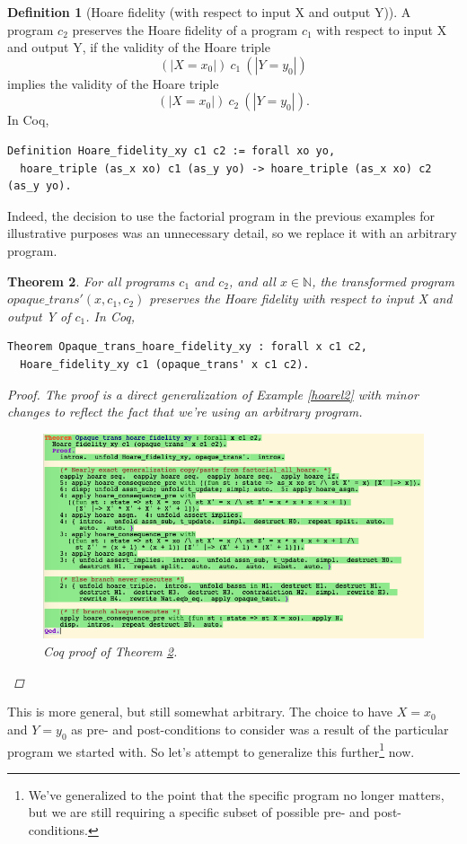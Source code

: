 \documentclass[12pt,notitlepage]{report}
\theoremstyle{plain}
\newtheorem{theo}{Theorem}[section]
\theoremstyle{definition}
\newtheorem{defin}[theo]{Definition}
\newcommand\N{\mathbb{N}}
\numberwithin{equation}{section}
\begin{document}
\begin{defin}[Hoare fidelity (with respect to input X and output Y)]
A program $c_2$ preserves the Hoare fidelity of a program $c_1$ with respect to input X and output Y, if the validity of the Hoare triple
\[
(| X = x_0 |)\ c_1\ (| Y = y_0 |)
\]
implies the validity of the Hoare triple
\[
(| X = x_0 |)\ c_2\ (| Y = y_0 |).
\]
In Coq,
\begin{verbatim}
Definition Hoare_fidelity_xy c1 c2 := forall xo yo,
  hoare_triple (as_x xo) c1 (as_y yo) -> hoare_triple (as_x xo) c2 (as_y yo).\end{verbatim}
\end{defin}

Indeed, the decision to use the factorial program in the previous examples for illustrative purposes was an unnecessary detail, so we replace it with an arbitrary program.

\begin{theo}\label{hoare_xy_main}
For all programs $c_1$ and $c_2$, and all $x \in \N$, the transformed program $opaque\_trans'(x, c_1, c_2)$ preserves the Hoare fidelity with respect to input X and output Y of $c_1$.  In Coq, \begin{verbatim}
Theorem Opaque_trans_hoare_fidelity_xy : forall x c1 c2,
  Hoare_fidelity_xy c1 (opaque_trans' x c1 c2).
\end{verbatim}
\begin{proof}
    The proof is a direct generalization of Example \ref{hoarel2} with minor changes to reflect the fact that we're using an arbitrary program.
    
    \noindent         \begin{figure}[H]
        \centering
        \includegraphics[scale=0.5]{hoare_xy_main}
        \caption{Coq proof of Theorem \ref{hoare_xy_main}.}
        \label{fig:hoare_xy_main}
        \end{figure}
\end{proof}
\end{theo}
This is more general, but still somewhat arbitrary.  The choice to have $X=x_0$ and $Y=y_0$ as pre- and post-conditions to consider was a result of the particular program we started with.  So let's attempt to generalize this further\footnote{We've generalized to the point that the specific program no longer matters, but we are still requiring a specific subset of possible pre- and post-conditions.} now.
\end{document}

